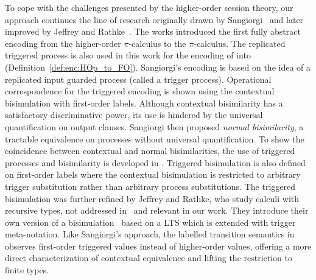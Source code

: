 To cope with the challenges presented by the higher-order
session theory, 
our approach continues the line of research 
originally drawn by Sangiorgi~\cite{San96H,SangiorgiD:expmpa}
and later improved by Jeffrey and Rathke~\cite{JeffreyR05}.
The works %
\cite{San96H,SangiorgiD:expmpa}
introduced the first fully abstract encoding from the higher-order 
$\pi$-calculus to the $\pi$-calculus. 
The replicated triggered process 
is also used in this work for the encoding of \HOp into \sessp (Definition~\ref{def:enc:HOp_to_FO}).
Sangiorgi's encoding is based on the idea of a replicated input guarded process 
(called a trigger process). Operational correspondence for
the triggered encoding is shown using the contextual bisimulation
with first-order labels.
Although contextual bisimilarity has a satisfactory discriminative power,
its use is hindered by the universal quantification on output clauses.
Sangiorgi then proposed \emph{normal bisimilarity}, a tractable  equivalence 
on processes without universal quantification. 
To show the coincidence between contextual and normal bisimilarities, 
the use of triggered processes and bisimilarity is developed in \cite{San96H}.
Triggered bisimulation is also defined on first-order labels
where the contextual bisimulation is restricted to arbitrary
trigger substitution rather than arbitrary process substitutions.
The triggered bisimulation was further refined by Jeffrey and
Rathke, who study calculi with recursive types, not addressed in~\cite{San96H,SangiorgiD:expmpa} and
relevant in our work.
They introduce their own version of a
bisimulation~\cite{JeffreyR05}
based on a LTS which is extended with trigger meta-notation.
Like Sangiorgi's approach, the labelled transition semantics
in~\cite{JeffreyR05}
observes first-order triggered values instead of
higher-order values, offering a more direct characterization of contextual equivalence
and lifting the restriction to finite types.


